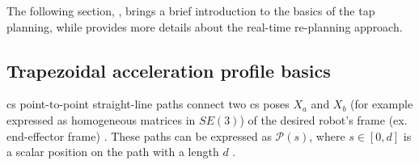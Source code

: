 The following section, , brings a brief introduction to the basics of the \gls{tap} planning, while  provides more details about the real-time re-planning approach. 
 
\subsection{Trapezoidal acceleration profile basics}

\gls{cs} point-to-point straight-line paths connect two \gls{cs} poses $X_a$ and $X_b$ (for example expressed as homogeneous matrices in $SE(3)$) of the desired robot's frame (ex. end-effector frame) \cite[Chapter 9.2.1]{modernrobotics}. These paths can be expressed as $\mathscr{P}(s)$, where $s\in\left[0,d\right]$ is a scalar position on the path with a length $d$ \cite{Constantinescu2000,Pfeiffer1987}. 

